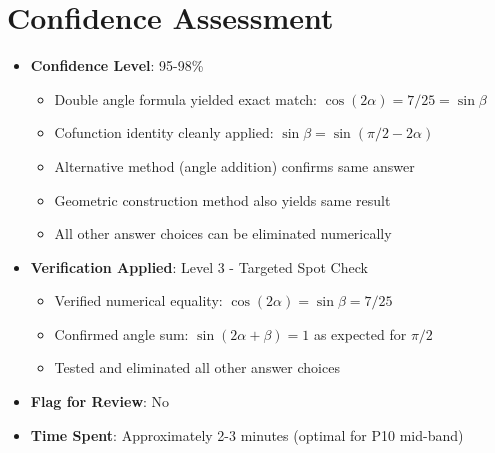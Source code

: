 \documentclass[11pt]{article}
\begin{document}
\section*{Confidence Assessment}
\begin{itemize}[leftmargin=*]
    \item \textbf{Confidence Level}: 95-98\%
    \begin{itemize}
        \item Double angle formula yielded exact match: $\cos(2\alpha) = 7/25 = \sin\beta$
        \item Cofunction identity cleanly applied: $\sin\beta = \sin(\pi/2 - 2\alpha)$
        \item Alternative method (angle addition) confirms same answer
        \item Geometric construction method also yields same result
        \item All other answer choices can be eliminated numerically
    \end{itemize}
    
    \item \textbf{Verification Applied}: Level 3 - Targeted Spot Check
    \begin{itemize}
        \item Verified numerical equality: $\cos(2\alpha) = \sin\beta = 7/25$
        \item Confirmed angle sum: $\sin(2\alpha + \beta) = 1$ as expected for $\pi/2$
        \item Tested and eliminated all other answer choices
    \end{itemize}
    
    \item \textbf{Flag for Review}: No
    
    \item \textbf{Time Spent}: Approximately 2-3 minutes (optimal for P10 mid-band)
\end{itemize}
\end{document}
